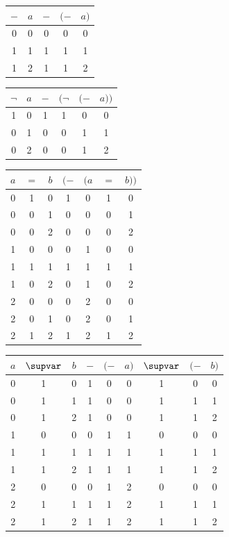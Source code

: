\documentclass{preprint}
\renewcommand{\to}{\supvar}
\begin{document}
\begin{center}
	\begin{tabular}{c c | c c c }
		$-$ & $a$ & $-$ & $(-$ & $a )$ \\
		\hline
		0 & 0 & 0 & 0 & 0\;\\
		1 & 1 & 1 & 1 & 1\;\\
		1 & 2 & 1 & 1 & 2\; \\
	\end{tabular}
	\qquad 
	\begin{tabular}{c c | c c c c }
		$\neg$ & $a$ & $-$ & $(\neg$ & $(-$ & $a ))$ \\
		\hline
		1 & 0\; & 1 & 1 & 0& 0\; \\
		0 & 1\; & 0 & 0 & 1& 1\; \\
		0 & 2\; & 0 & 0 & 1& 2\; \\
	\end{tabular}
	
	
	\begin{tabular}{c c c | c c c c }
		$a $ & $=$ & $b$ & $(-$ & $( a$ & $=$ & $ b))$ \\
		\hline
		0 & 1 & 	0 	& 1 & 0 & 1 & 0 \\
		0 & 0 & 	1 	& 0 & 0 & 0 & 1 \\
		0 & 0 & 	2 	& 0 & 0 & 0 & 2 \\
		1 & 0 & 	0 	& 0 & 1 & 0 & 0 \\
		1 & 1 & 	1 	& 1 & 1 & 1 & 1 \\
		1 & 0 & 	2 	& 0 & 1 & 0 & 2 \\
		2 & 0 & 	0 	& 0 & 2 & 0 & 0 \\
		2 & 0 & 	1 	& 0 & 2 & 0 & 1 \\
		2 & 1 & 	2 	& 1 & 2 & 1 & 2 \\
	\end{tabular}
	\qquad 
	\begin{tabular}{c c c | c c c c c c}
		$a $ & $\to$ & $b$ & $-$ & $(-$ & $a)$ & $\to$ & $(-$ & $b)$ \\
		\hline
		0 & 1 & 	0 	& 1 & 0 & 0\; & 1 & 0 & 0\; \\
		0 & 1 & 	1 	& 1 & 0 & 0\; & 1 & 1 & 1\; \\
		0 & 1 & 	2 	& 1 & 0 & 0\; & 1 & 1 & 2\; \\
		1 & 0 & 	0 	& 0 & 1 & 1\; & 0 & 0 & 0\; \\
		1 & 1 & 	1 	& 1 & 1 & 1\; & 1 & 1 & 1\; \\
		1 & 1 & 	2 	& 1 & 1 & 1\; & 1 & 1 & 2\; \\
		2 & 0 & 	0 	& 0 & 1 & 2\; & 0 & 0 & 0\; \\
		2 & 1 & 	1 	& 1 & 1 & 2\; & 1 & 1 & 1\; \\
		2 & 1 & 	2 	& 1 & 1 & 2\; & 1 & 1 & 2\; \\
	\end{tabular}
\end{center}
\end{document}
